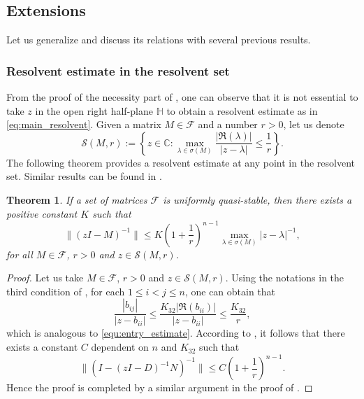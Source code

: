 \documentclass{article}
\theoremstyle{plain}%
\newtheorem{theorem}{Theorem}%
\theoremstyle{definition}%
\theoremstyle{remark}%
\newcommand{\bC}{\mathbb{C}}
\newcommand{\bH}{\mathbb{H}}
\newcommand{\cF}{\mathcal{F}}
\newcommand{\cS}{\mathcal{S}}
\newcommand{\+}[1]{{\bm{#1}}}
\newcommand{\norm}[1]{\|{#1}\|}
\begin{document}
\subsection{Extensions}
Let us generalize  and discuss its 
relations with several previous results.

\subsubsection{Resolvent estimate in the resolvent set}
From the proof of the necessity part of , one can 
observe that it is not essential to take $z$ in the open right 
half-plane $\bH$ to obtain a resolvent estimate as in 
\cref{eq:main_resolvent}. Given a matrix $M \in \cF$ and a number 
$r > 0$, let us denote 
\begin{displaymath}
  \cS(M, r) := 
  \left\{ z \in \bC : \max_{\lambda \in \sigma(M)} 
  \frac{|\Re(\lambda)|}{|z - \lambda|} \le \frac{1}{r} \right\}.
\end{displaymath}
The following theorem provides a resolvent estimate at any point in 
the resolvent set. Similar results can be found in 
\cite{miller_resolvent_1968}.
\begin{theorem}\label{thm:main_miller}
  If a set of matrices $\cF$ is uniformly quasi-stable, then there 
  exists a positive constant $K$ such that 
  \begin{displaymath}
    \norm{(z I - M)^{-1}} \le K \left( 1 + \frac{1}{r} \right)^{n - 1}
    \max_{\lambda \in \sigma(M)} |z - \lambda|^{-1},
  \end{displaymath}
  for all $M \in \cF$, $r > 0$ and $z \in \cS(M, r)$.
\end{theorem}
\begin{proof}
  Let us take $M \in \cF$, $r > 0$ and $z \in \cS(M, r)$. Using the 
  notations in the third condition of , for each 
  $1 \le i < j \le n$, one can obtain that 
  \begin{displaymath}
    \frac{|b_{ij}|}{|z - b_{ii}|} \le 
    \frac{K_{32} |\Re(b_{ii})|}{|z - b_{ii}|} \le \frac{K_{32}}{r},
  \end{displaymath}
  which is analogous to \cref{equ:entry_estimate}. 
  According to , it follows that there exists a 
  constant $C$ dependent on $n$ and $K_{32}$ such that 
  \begin{displaymath}
    \norm{\left( I - (z I - D)^{-1} N \right)^{-1}} \le 
    C \left( 1 + \frac{1}{r} \right)^{n - 1}.
  \end{displaymath}
  Hence the proof is completed by a similar argument in the proof of 
  .
\end{proof}
\end{document}

